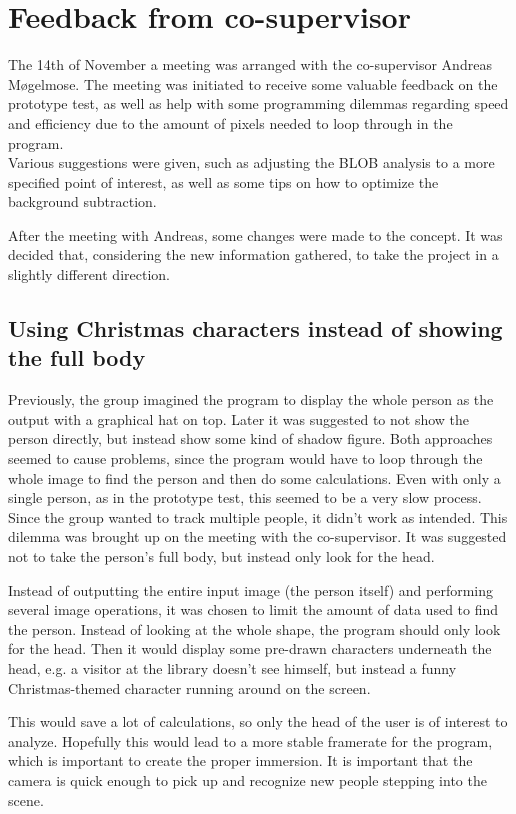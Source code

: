 \section{Feedback from co-supervisor}
The 14th of November a meeting was arranged with the co-supervisor Andreas M{\o}gelmose. The meeting was initiated to receive some valuable feedback on the prototype test, as well as help with some programming dilemmas regarding speed and efficiency due to the amount of pixels needed to loop through in the program.\\
Various suggestions were given, such as adjusting the BLOB analysis to a more specified point of interest, as well as some tips on how to optimize the background subtraction.

After the meeting with Andreas, some changes were made to the concept. It was decided that, considering the new information gathered, to take the project in a slightly different direction.

\subsection{Using Christmas characters instead of showing the full body}
Previously, the group imagined the program to display the whole person as the output with a graphical hat on top. Later it was suggested to not show the person directly, but instead show some kind of shadow figure. Both approaches seemed to cause problems, since the program would have to loop through the whole image to find the person and then do some calculations. Even with only a single person, as in the prototype test, this seemed to be a very slow process. Since the group wanted to track multiple people, it didn't work as intended. This dilemma was brought up on the meeting with the co-supervisor. It was suggested not to take the person's full body, but instead only look for the head.

Instead of outputting the entire input image (the person itself) and performing several image operations, it was chosen to limit the amount of data used to find the person. Instead of looking at the whole shape, the program should only look for the head. Then it would display some pre-drawn characters underneath the head, e.g. a visitor at the library doesn't see himself, but instead a funny Christmas-themed character running around on the screen.

This would save a lot of calculations, so only the head of the user is of interest to analyze. Hopefully this would lead to a more stable framerate for the program, which is important to create the proper immersion. It is important that the camera is quick enough to pick up and recognize new people stepping into the scene.

